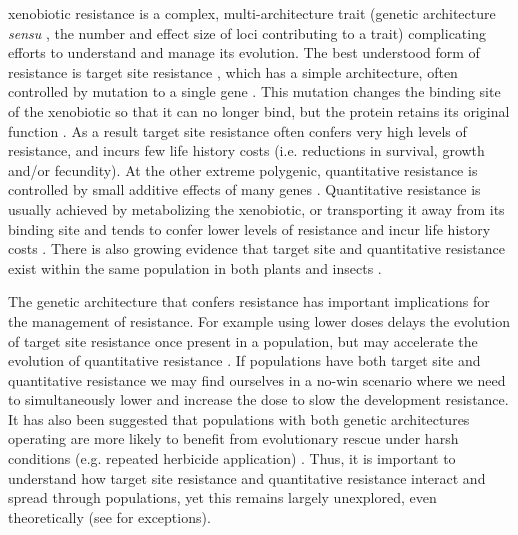 \documentclass[10pt,letterpaper]{article}
\begin{document}
xenobiotic resistance is a complex, multi-architecture trait (genetic architecture \textit{sensu} \cite{Deba2015}, the number and effect size of loci contributing to a trait) \cite{Warw1991, Neve2007, Dely2013, Bauc2016} complicating efforts to understand and manage its evolution. The best understood form of resistance is target site resistance \cite{Warw1991, Neve2007, Dely2013, Serv2013}, which has a simple architecture, often controlled by mutation to a single gene \cite{Bauc2016}. This mutation changes the binding site of the xenobiotic so that it can no longer bind, but the protein retains its original function \cite{Dely2013, Bauc2016}. As a result target site resistance often confers very high levels of resistance, and incurs few life history costs (i.e. reductions in survival, growth and/or fecundity)\cite{Warw1994, Vila2005, Bauc2016}. At the other extreme polygenic, quantitative resistance is controlled by small additive effects of many genes \cite{Land1989, Mack2009, Dely2013, Rajo2013}. Quantitative resistance is usually achieved by metabolizing the xenobiotic, or transporting it away from its binding site \cite{Dely2013, Bauc2016} and tends to confer lower levels of resistance and incur life history costs \cite{Vila2005, Bauc2016}. There is also growing evidence that target site and quantitative resistance exist within the same population in both plants \cite{Warw1991, Vila2005, Herr2014, Han2016} and insects \cite{Gard1998, Donn2009, Bing2011, Hend2013, Oake2013}.

The genetic architecture that confers resistance has important implications for the management of resistance. For example using lower doses delays the evolution of target site resistance once present in a population, but may accelerate the evolution of quantitative resistance \cite{Gard1998}. If populations have both target site and quantitative resistance we may find ourselves in a no-win scenario where we need to simultaneously lower and increase the dose to slow the development resistance. It has also been suggested that populations with both genetic architectures operating are more likely to benefit from evolutionary rescue under harsh conditions (e.g. repeated herbicide application) \cite{Gomu2010}. Thus, it is important to understand how target site resistance and quantitative resistance interact and spread through populations, yet this remains largely unexplored, even theoretically (see \cite{Gomu2010, Deba2015, Yeam2015} for exceptions). 
\end{document}
